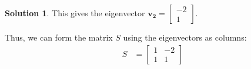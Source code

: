 \documentclass[11pt]{article}
\theoremstyle{definition}
\newtheorem*{solution}{Solution}
\begin{document}
\begin{solution}
    This gives the eigenvector $\mathbf{v_2} = \begin{bmatrix}
        -2 \\ 1
    \end{bmatrix}$.

    Thus, we can form the matrix $S$ using the eigenvectors as columns:
    \begin{align}
        S &= \begin{bmatrix}
            1 & -2 \\
            1 & 1
        \end{bmatrix}
    \end{align}
\end{solution}

\end{document}
